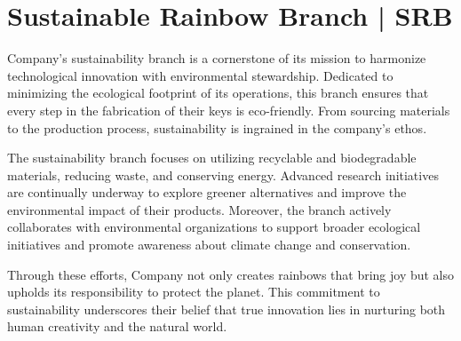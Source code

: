 \section{Sustainable Rainbow Branch | SRB}
Company’s sustainability branch is a cornerstone of its mission to harmonize technological innovation with environmental stewardship. Dedicated to minimizing the ecological footprint of its operations, this branch ensures that every step in the fabrication of their keys is eco-friendly. From sourcing materials to the production process, sustainability is ingrained in the company’s ethos.

The sustainability branch focuses on utilizing recyclable and biodegradable materials, reducing waste, and conserving energy. Advanced research initiatives are continually underway to explore greener alternatives and improve the environmental impact of their products. Moreover, the branch actively collaborates with environmental organizations to support broader ecological initiatives and promote awareness about climate change and conservation.

Through these efforts, Company not only creates rainbows that bring joy but also upholds its responsibility to protect the planet. This commitment to sustainability underscores their belief that true innovation lies in nurturing both human creativity and the natural world.